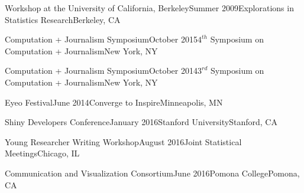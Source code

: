 \begin{sSubsection}{Workshop at the University of California, Berkeley}{}{Summer 2009}{Explorations in Statistics Research}{Berkeley, CA}
\end{sSubsection}


\begin{sSubsection}{Computation + Journalism Symposium}{}{October 2015}{$4^{th}$ Symposium on Computation + Journalism}{New York, NY}
\end{sSubsection}

\begin{sSubsection}{Computation + Journalism Symposium}{}{October 2014}{$3^{rd}$ Symposium on Computation + Journalism}{New York, NY}
\end{sSubsection}

\begin{sSubsection}{Eyeo Festival}{}{June 2014}{Converge to Inspire}{Minneapolis, MN}
\end{sSubsection}

\begin{sSubsection}{Shiny Developers Conference}{}{January 2016}{Stanford University}{Stanford, CA}
\end{sSubsection}


\begin{sSubsection}{Young Researcher Writing Workshop}{}{August 2016}{Joint Statistical Meetings}{Chicago, IL}
\end{sSubsection}


\begin{sSubsection}{Communication and Visualization Consortium}{}{June 2016}{Pomona College}{Pomona, CA}
\end{sSubsection}



%
%


